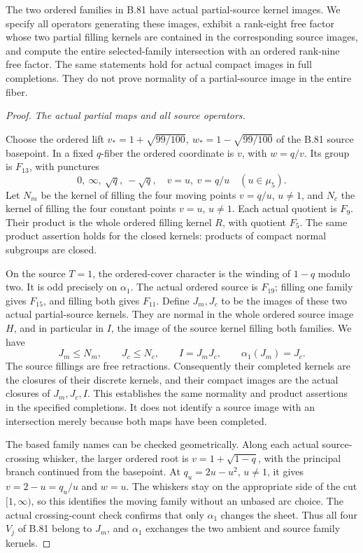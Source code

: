 The two ordered families in B.81 have actual partial-source kernel images.
We specify all operators generating these images, exhibit a rank-eight
free factor whose two partial filling kernels are contained in the
corresponding source images, and compute the entire selected-family
intersection with an ordered rank-nine free factor. The same statements
hold for actual compact images in full completions. They do not prove
normality of a partial-source image in the entire fiber.

\begin{proof}
\emph{The actual partial maps and all source operators.}\par
Choose the ordered lift
\(v_*=1+\sqrt{99/100},\ w_*=1-\sqrt{99/100}\) of the B.81 source
basepoint. In a fixed \(q\)-fiber the ordered coordinate is \(v\), with
\(w=q/v\). Its group is \(F_{13}\), with punctures
\[
 0,\ \infty,\ \sqrt q,\ -\sqrt q,\quad
 v=u,\ v=q/u\quad(u\in\mu _5).
 \tag{B.82.1}
\]
Let \(N_m\) be the kernel of filling the four moving points
\(v=q/u\), \(u\ne1\), and \(N_c\) the kernel of filling the four
constant points \(v=u\), \(u\ne1\). Each actual quotient is \(F_9\).
Their product is the whole ordered filling kernel \(R\), with quotient
\(F_5\). The same product assertion holds for the closed kernels:
products of compact normal subgroups are closed.

On the source \(T=1\), the ordered-cover character is the winding of
\(1-q\) modulo two. It is odd precisely on \(\alpha _1\).
The actual ordered source is \(F_{19}\); filling one family gives
\(F_{15}\), and filling both gives \(F_{11}\). Define
\(J_m,J_c\) to be the images of these two actual partial-source
kernels. They are normal in the whole ordered source image \(H\),
and in particular in \(I\), the image of the source kernel filling
both families. We have
\[
 J_m\le N_m,\qquad J_c\le N_c,\qquad
 I=J_mJ_c,\qquad \alpha _1(J_m)=J_c.
 \tag{B.82.2}
\]
The source fillings are free retractions. Consequently their completed
kernels are the closures of their discrete kernels, and their compact
images are the actual closures of \(J_m,J_c,I\). This establishes the
same normality and product assertions in the specified completions.
It does not identify a source image with an intersection merely because
both maps have been completed.

The based family names can be checked geometrically. Along each actual
source-crossing whisker, the larger ordered root is
\(v=1+\sqrt{1-q}\), with the principal branch continued from the
basepoint. At \(q_u=2u-u^2\), \(u\ne1\), it gives
\(v=2-u=q_u/u\) and \(w=u\). The whiskers stay on the appropriate
side of the cut \([1,\infty)\), so this identifies the moving family
without an unbased arc choice. The actual crossing-count check confirms
that only \(\alpha _1\) changes the sheet. Thus all four \(V_j\) of
B.81 belong to \(J_m\), and \(\alpha _1\) exchanges the two ambient
and source family kernels.


\end{proof}
